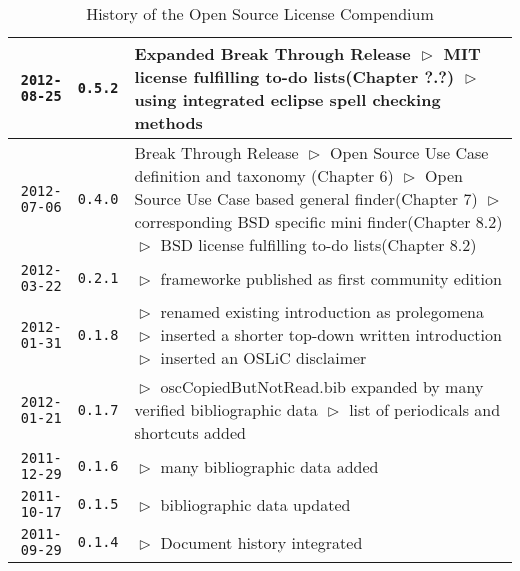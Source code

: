 \begin{table}
\footnotesize
\caption{History of the Open Source License Compendium}
\begin{center}
\begin{tabular}{|r|c|p{10cm}|}
\hline
\hline
    \texttt{2012-08-25}
  & \texttt{0.5.2} 
  & Expanded Break Through Release\newline
    $\vartriangleright$ MIT license fulfilling to-do lists(Chapter ?.?)\newline
    $\vartriangleright$ using integrated eclipse spell checking methods\newline
    \\

\hline
    \texttt{2012-07-06}
  & \texttt{0.4.0} 
  & Break Through Release\newline
    $\vartriangleright$ Open Source Use Case definition and taxonomy
    (Chapter 6)\newline 
    $\vartriangleright$ Open Source Use Case based general finder(Chapter
    7)\newline 
    $\vartriangleright$ corresponding BSD specific mini finder(Chapter
    8.2)\newline 
    $\vartriangleright$ BSD license fulfilling to-do lists(Chapter 8.2)\\
\hline
    \texttt{2012-03-22}
  & \texttt{0.2.1} 
  & $\vartriangleright$ frameworke published as first community edition\\
\hline
    \texttt{2012-01-31}
  & \texttt{0.1.8} 
  & $\vartriangleright$ renamed existing introduction as prolegomena\newline
    $\vartriangleright$ inserted a shorter top-down written introduction\newline
    $\vartriangleright$ inserted an OSLiC disclaimer\\
\hline
    \texttt{2012-01-21}
  & \texttt{0.1.7} 
  & $\vartriangleright$ oscCopiedButNotRead.bib expanded by many verified
  bibliographic data \newline 
  $\vartriangleright$ list of periodicals and shortcuts added\\
\hline
    \texttt{2011-12-29}
  & \texttt{0.1.6} 
  & $\vartriangleright$ many bibliographic data added\\
\hline
    \texttt{2011-10-17}
  & \texttt{0.1.5} 
  & $\vartriangleright$ bibliographic data updated\\
\hline
    \texttt{2011-09-29}
  & \texttt{0.1.4} 
  & $\vartriangleright$ Document history integrated\newline

\end{tabular}
\end{center}
\end{table}
